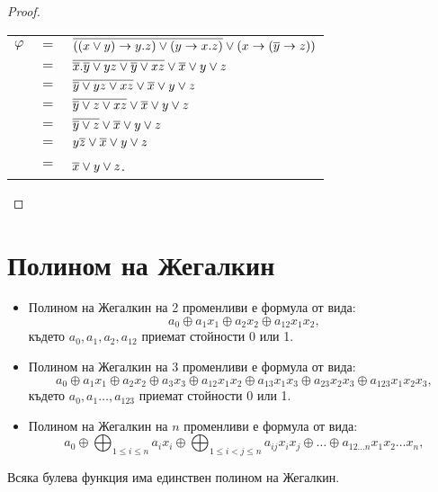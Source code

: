 \begin{proof}
\begin{itemize}
    \begin{tabular}{l c l}
      $\varphi $ & $ = $ & $\overline{((x\vee y) \rightarrow y.z)\vee (y\rightarrow x.z)} \vee (x\rightarrow (\overline{y}\rightarrow z)) $\\
      & $=$ & $\overline{\overline{x}.\overline{y}\vee yz \vee \overline{y}\vee xz} \vee \overline{x}\vee y \vee z$\\
      & $=$& $\overline{\overline{y}\vee yz \vee xz} \vee \overline{x}\vee y \vee z$ \\
      & $=$ & $\overline{\overline{y}\vee z \vee xz} \vee \overline{x}\vee y \vee z$\\
      & $=$ & $\overline{\overline{y}\vee z} \vee \overline{x}\vee y \vee z$ \\
      & $=$ & $y\overline{z} \vee \overline{x}\vee y \vee z$ \\
      & $=$ & $\overline{x}\vee y \vee z$.
    \end{tabular}
\end{itemize}
\end{proof}

\section{Полином на Жегалкин}

\begin{itemize}
\item 
  Полином на Жегалкин на 2 променливи е формула от вида:
  \[a_0\oplus a_1x_1\oplus a_2x_2  \oplus a_{12}x_1x_2  ,\]
  където $a_0,a_1,a_2,a_{12}$ приемат стойности 0 или 1.
\item
  Полином на Жегалкин на 3 променливи е формула от вида:
  \[a_0\oplus a_1x_1\oplus a_2x_2 \oplus a_3x_3 \oplus a_{12}x_1x_2 \oplus a_{13}x_1x_3 \oplus a_{23} x_2x_3 \oplus a_{123}x_1x_2x_3,\]  
  където $a_0,a_1\dots,a_{123}$ приемат стойности 0 или 1.
\item
  Полином на Жегалкин на $n$ променливи е формула от вида:
  \[a_0 \oplus \bigoplus_{1\leq i\leq n}a_i x_i\oplus \bigoplus_{1\leq i<j \leq n}a_{ij} x_ix_j\oplus\dots  \oplus a_{12\dots n} x_1x_2\dots x_n,\]
\end{itemize}

\begin{thm}
  Всяка булева функция има единствен полином на Жегалкин.
\end{thm}



